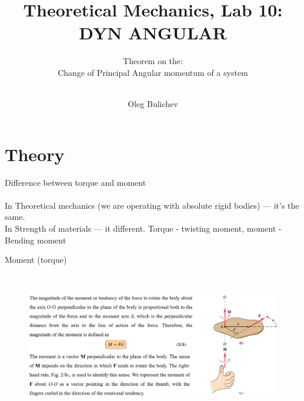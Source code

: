 \documentclass[aspectratio=169]{beamer}
\title[Theoretical Mechanics]{Theoretical Mechanics, Lab 10: DYN ANGULAR} %
\subtitle{Theorem on the: \\
Change of Principal Angular momentum of a system \\ \ } %
\author{Oleg Bulichev}
\newcommand{\fbckg}[1]{\usebackgroundtemplate{\texttt{[image: \#1]}}}%
\begin{document}
\setlength{\abovedisplayskip}{0pt}
\setlength{\belowdisplayskip}{0pt}
\setlength{\abovedisplayshortskip}{0pt}
\setlength{\belowdisplayshortskip}{0pt}

\fbckg{fibeamer/figs/title_page.png}

\fbckg{fibeamer/figs/common.png}


\section*{Theory}

\begin{frame}[t]{Difference between torque and moment}
    \framesubtitle{}
    \begin{minipage}{0.8\textwidth}
        In Theoretical mechanics (we are operating with absolute rigid 
        bodies) — it’s the same. \\
        In Strength of materials — it different. Torque - twisting moment, 
        moment - Bending moment \\
    \end{minipage}
    \end{frame}
    
    \begin{frame}[t]{Moment (torque)}
    \framesubtitle{}
        \vspace{-0.6cm}
        \begin{figure}[H]
            \centering\includegraphics[height=6cm,width=1\textwidth,keepaspectratio]{image14.png}
            \label{fig:image14}
        \end{figure}
    \end{frame}
    
\end{document}
